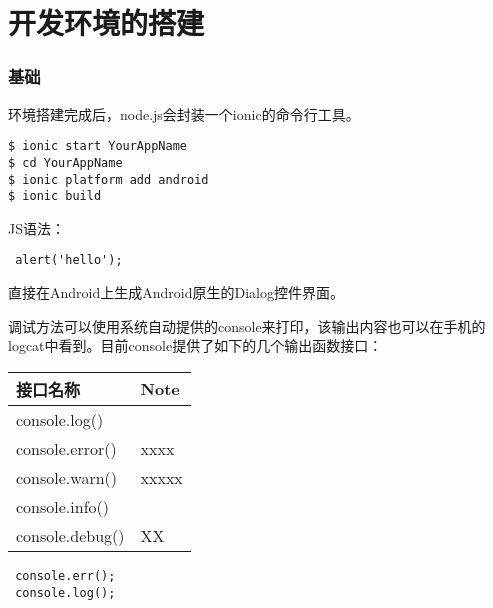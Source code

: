 \chapter{开发环境的搭建}

\subsection{基础}

环境搭建完成后，node.js会封装一个ionic的命令行工具。

\begin{lstlisting}
$ ionic start YourAppName
$ cd YourAppName
$ ionic platform add android
$ ionic build
\end{lstlisting}


JS语法：
\begin{lstlisting}
 alert('hello');
\end{lstlisting}

直接在Android上生成Android原生的Dialog控件界面。


调试方法可以使用系统自动提供的console来打印，该输出内容也可以在手机的logcat中看到。目前console提供了如下的几个输出函数接口：

\bgroup
\def\arraystretch{1.15} 
\begin{tabular}{|l|l|}
{接口名称} & {Note}  \\
\hline
 {console.log()} & {} \\
 {console.error()} & {xxxx}\\
 {console.warn()} & {xxxxx}\\
 {console.info()} & {} \\
 {console.debug()} & {XX} \\
\end{tabular}
\egroup

\begin{lstlisting}
 console.err();
 console.log();
\end{lstlisting}
